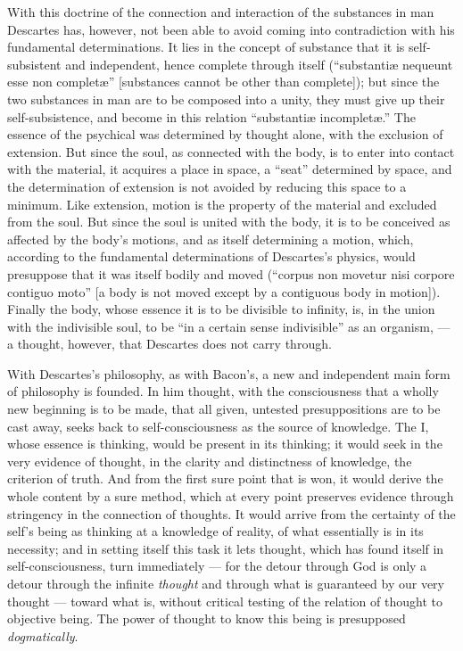 With this doctrine of the connection and interaction of the substances in man Descartes has, however, not been able to avoid coming into contradiction with his fundamental determinations. It lies in the concept of substance that it is self-subsistent and independent, hence complete through itself (``substantiæ nequeunt esse non completæ'' [substances cannot be other than complete]); but since the two substances in man are to be composed into a unity, they must give up their self-subsistence, and become in this relation ``substantiæ incompletæ.'' The essence of the psychical was determined by thought alone, with the exclusion of extension. But since the soul, as connected with the body, is to enter into contact with the material, it acquires a place in space, a ``seat'' determined by space, and the determination of extension is not
avoided by reducing this space to a minimum. Like extension, motion is the property of the material and excluded from the soul. But since the soul is united with the body, it is to be conceived as affected by the body's motions, and as itself determining a motion, which, according to the fundamental determinations of Descartes's physics, would presuppose that it was itself bodily and moved (``corpus non movetur nisi corpore contiguo moto'' [a body is not moved except by a contiguous body in motion]). Finally the body, whose essence it is to be divisible to infinity, is, in the union with the indivisible soul, to be ``in a certain sense indivisible'' as an organism, --- a thought, however, that Descartes does not carry through.

\divrule

With Descartes's philosophy, as with Bacon's, a new and independent main form of philosophy is founded. In him thought, with the consciousness that a wholly new beginning is to be made, that all given, untested presuppositions are to be cast away, seeks back to self-consciousness as the source of knowledge. The I, whose essence is thinking, would be present in its thinking; it would seek in the very evidence of thought, in the clarity and distinctness of knowledge, the criterion of truth. And from the first sure point that is won, it would derive the whole content by a sure method, which at every point preserves evidence through stringency in the connection of thoughts. It would arrive from the certainty of the self's being as thinking at a knowledge of reality, of what essentially is in its necessity; and in setting itself this task it lets thought, which has found itself in self-consciousness, turn immediately --- for the detour through God is only a detour through the infinite \emph{thought} and through what is guaranteed by our very thought --- toward what is, without critical testing of the relation of thought to objective being. The power of thought to know this being is presupposed \emph{dogmatically}.

